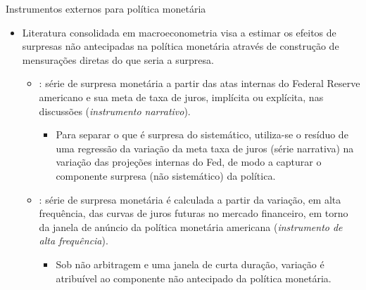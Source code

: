 \documentclass[11pt]{beamer}
\begin{document}
\begin{frame}{Instrumentos externos para política monetária}
	\begin{itemize}
		\item  Literatura consolidada em macroeconometria visa a estimar os efeitos de surpresas não antecipadas na política monetária através de construção de mensurações diretas do que seria a surpresa.
		\begin{itemize}
			\item \citet{Romer2004}: série de surpresa monetária a partir das atas internas do Federal Reserve americano e sua meta de taxa de juros, implícita ou explícita, nas discussões ({\color{blue}\textit{instrumento narrativo}}). 
			\begin{itemize}
				\item Para separar o que é surpresa do sistemático, utiliza-se o resíduo de uma regressão da variação da meta taxa de juros (série narrativa) na variação das projeções internas do Fed, de modo a capturar o componente surpresa (não sistemático) da política.
			\end{itemize}
						\item \citet{Gertler2015}: série de surpresa monetária é calculada a partir da variação, em alta frequência, das curvas de juros futuras no mercado financeiro, em torno da janela de anúncio da política monetária americana ({\color{blue}\textit{instrumento de alta frequência}}).
						\begin{itemize}
							\item Sob não arbitragem e uma janela de curta duração, variação é atribuível ao componente não antecipado da política monetária.
						\end{itemize}
		\end{itemize}
	\end{itemize}
\end{frame}
\end{document}
